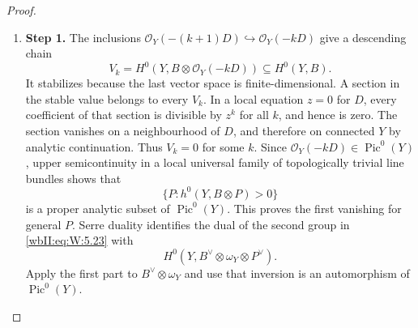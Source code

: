 \begin{proof}
\begin{enumerate}[label={$\langle1\rangle$\arabic*.},leftmargin=*]
\item 
\noindent\textbf{Step 1.} The inclusions \(\mathcal O_Y(-(k+1)D)\hookrightarrow
\mathcal O_Y(-kD)\) give a descending chain
\[
 V_k=H^0(Y,B\otimes\mathcal O_Y(-kD))
 \subseteq H^0(Y,B).
\]
It stabilizes because the last vector space is finite-dimensional.  A
section in the stable value belongs to every \(V_k\).  In a local equation
\(z=0\) for \(D\), every coefficient of that section is divisible by
\(z^k\) for all \(k\), and hence is zero.  The section vanishes on a
neighbourhood of \(D\), and therefore on connected \(Y\) by analytic
continuation.  Thus \(V_k=0\) for some \(k\).  Since
\(\mathcal O_Y(-kD)\in\operatorname{Pic}^0(Y)\), upper semicontinuity in a
local universal family of topologically trivial line bundles shows that
\[
 \{P:h^0(Y,B\otimes P)>0\}
\]
is a proper analytic subset of \(\operatorname{Pic}^0(Y)\).  This proves
the first vanishing for general \(P\).  Serre duality identifies the dual
of the second group in \eqref{wbII:eq:W:5.23} with
\[
 H^0(Y,B^\vee\otimes\omega_Y\otimes P^\vee).
\]
Apply the first part to \(B^\vee\otimes\omega_Y\) and use that inversion is
an automorphism of \(\operatorname{Pic}^0(Y)\).

\end{enumerate}
\end{proof}
